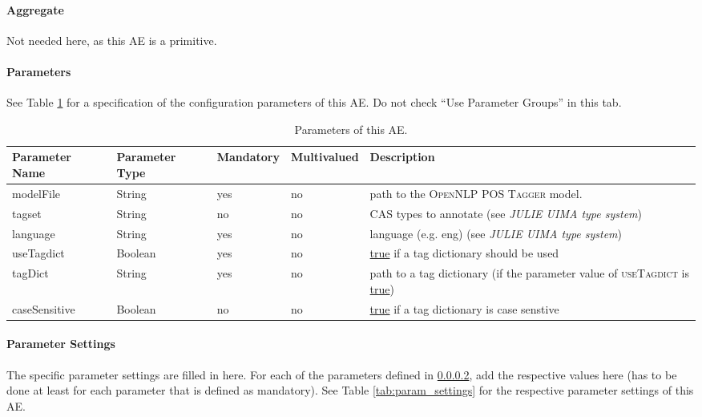 \documentclass[11pt,a4paper,halfparskip]{scrartcl}
\begin{document}
\paragraph{Aggregate}
Not needed here, as this AE is a primitive.

\paragraph{Parameters}
\label{sss:parameters}

See Table \ref{tab:parameters} for a specification of the
configuration parameters of this AE. Do not check ``Use Parameter
Groups'' in this tab.

\begin{table}[h!]
  \centering
  \begin{tabular}{|p{4cm}|p{2cm}|p{2cm}|p{2cm}|p{4cm}|}
    \hline 
    Parameter Name & Parameter Type & Mandatory & Multivalued & Description \\
   \hline \hline
      modelFile & String & yes &no &  path to the \textsc{OpenNLP POS Tagger}
model.\\
 tagset & String & no &no &  CAS types to annotate (see \emph{JULIE UIMA type system}) \\
 language & String & yes & no &  language (e.g. eng) (see \emph{JULIE UIMA type system}) \\
 useTagdict & Boolean & yes & no &  \url{true} if a tag dictionary should be used \\
 tagDict & String & yes & no &  path to a tag dictionary (if the parameter value 
of \textsc{useTagdict} is \url{true})\\
 caseSensitive & Boolean & no & no &  \url{true} if a tag dictionary is case senstive \\
  \hline
  \end{tabular}
  \caption{Parameters of this AE.}
  \label{tab:parameters}
\end{table}


\paragraph{Parameter Settings}
\label{sss:param_settings}

The specific parameter settings are filled in here. For each of the
parameters defined in \ref{sss:parameters}, add the respective values
here (has to be done at least for each parameter that is defined as
mandatory). See Table \ref{tab:param_settings} for the respective
parameter settings of this AE.
\end{document}
